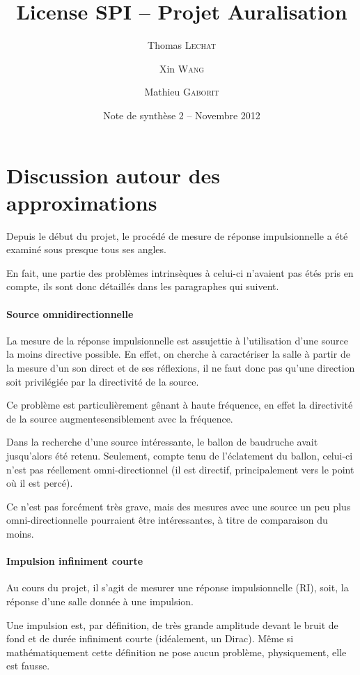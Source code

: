 \documentclass[12pt]{article}
\title{License SPI -- Projet Auralisation}
\author{Thomas \textsc{Lechat} \and Xin \textsc{Wang} \and Mathieu \textsc{Gaborit}}
\date{Note de synthèse 2 -- Novembre 2012}
\begin{document}
 \maketitle

\tableofcontents

\section{Discussion autour des approximations} %

Depuis le début du projet, le procédé de mesure de réponse impulsionnelle a été examiné sous presque tous ses angles.

En fait, une partie des problèmes intrinsèques à celui-ci n'avaient pas étés pris en compte, ils sont donc détaillés dans
les paragraphes qui suivent.

\paragraph{Source omnidirectionnelle} %

La mesure de la réponse impulsionnelle est assujettie à l'utilisation d'une source la moins directive possible.
En effet, on cherche à caractériser la salle à partir de la mesure d'un son direct et de ses réflexions, il ne faut donc
pas qu'une direction soit privilégiée par la directivité de la source.

Ce problème est particulièrement gênant à haute fréquence, en effet la directivité de la source augmentesensiblement
avec la fréquence.

Dans la recherche d'une source intéressante, le ballon de baudruche avait jusqu'alors été retenu.
Seulement, compte tenu de l'éclatement du ballon, celui-ci n'est pas réellement omni-directionnel (il est directif,
principalement vers le point où il est percé).

Ce n'est pas forcément très grave, mais des mesures avec une source un peu plus omni-directionnelle pourraient être
intéressantes, à titre de comparaison du moins.

\paragraph{Impulsion infiniment courte} %

Au cours du projet, il s'agit de mesurer une réponse impulsionnelle (RI), soit, la réponse d'une salle donnée à une
impulsion.

Une impulsion est, par définition, de très grande amplitude devant le bruit de fond et de durée infiniment courte
(idéalement, un Dirac). Même si mathématiquement cette définition ne pose aucun problème, physiquement, elle est
fausse.
\end{document}
